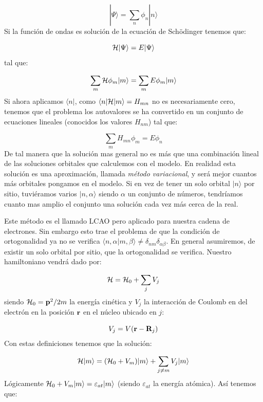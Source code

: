 \begin{equation}
	|\Psi \rangle = \sum_n \phi_n |n\rangle
\end{equation}
Si la función de ondas es solución de la ecuación de Schödinger tenemos que:

\begin{equation}
	\mathcal{H} |\Psi \rangle = E |\Psi \rangle
\end{equation}
tal que:

\begin{equation}
	\sum_m \mathcal{H} \phi_m |m\rangle =  \sum_m E \phi_m |m\rangle
\end{equation}
Si ahora aplicamos $\langle n |$, como $\langle n| \mathcal{H} | m \rangle= H_{mn}$ no es necesariamente cero, tenemos que el problema los autovalores se ha convertido en un conjunto de ecuaciones lineales (conocidos los valores $H_{nm}$) tal que:


\begin{equation}
	\sum_m H_{mn} \phi_m  =  E \phi_n
\end{equation}
De tal manera que la solución mas general no es más que una combinación lineal de las soluciones orbitales que calculemos con el modelo. En realidad esta solución es una aproximación, llamada \textit{método variacional}, y será mejor cuantos más orbitales pongamos en el modelo. Si en vez de tener un solo orbital $|n\rangle$ por sitio, tuviéramos varios $|n,\alpha\rangle$ siendo $\alpha$ un conjunto de números, tendríamos cuanto mas amplio el conjunto una solución cada vez más cerca de la real.

Este método es el llamado LCAO pero aplicado para nuestra cadena de electrones. Sin embargo esto trae el problema de que la condición de ortogonalidad ya no se verifica $\langle n ,\alpha | m,\beta \rangle \neq \delta_{nm} \delta_{\alpha \beta}$. En general asumiremos, de existir un solo orbital por sitio, que la ortogonalidad se verifica. Nuestro hamiltoniano vendrá dado por:

\begin{equation}
	\mathcal{H} = \mathcal{H}_0 + \sum_{j} V_j
\end{equation}
siendo $\mathcal{H}_0 = \mathbf{p}^2 /2m$ la energía cinética y $V_j$ la interacción de Coulomb en del electrón en la posición $\mathbf{r}$ en el núcleo ubicado en $j$:

\begin{equation}
	V_j = V(\mathbf{r}-\mathbf{R}_j)
\end{equation}
Con estas definiciones tenemos que la solución:

\begin{equation}
	\mathcal{H} |m\rangle = (\mathcal{H}_0 + V_m) |m\rangle + \sum_{j\neq m} V_j |m\rangle
\end{equation}
Lógicamente $\mathcal{H}_0 +V_m |m\rangle = \varepsilon_{at}|m\rangle$ (siendo $\varepsilon_{at}$ la energía atómica). Así tenemos que:

